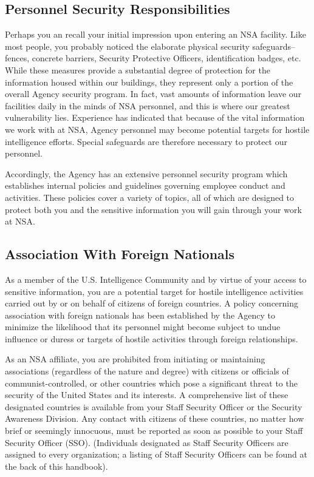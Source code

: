 \documentclass[a4]{article}
\begin{document}
\subsection{Personnel Security Responsibilities}

Perhaps you an recall your initial impression upon entering an NSA facility.
Like most people, you probably noticed the elaborate physical security
safeguards--fences, concrete barriers, Security Protective Officers,
identification badges, etc.  While these measures provide a substantial degree
of protection for the information housed within our buildings, they represent
only a portion of the overall Agency security program.  In fact, vast amounts
of information leave our facilities daily in the minds of NSA personnel, and
this is where our greatest vulnerability lies.  Experience has indicated that
because of the vital information we work with at NSA, Agency personnel may
become potential targets for hostile intelligence efforts.  Special safeguards
are therefore necessary to protect our personnel.

Accordingly, the Agency has an extensive personnel security program which
establishes internal policies and guidelines governing employee conduct and
activities.  These policies cover a variety of topics, all of which are
designed to protect both you and the sensitive information you will gain
through your work at NSA.

\subsection{Association With Foreign Nationals}

As a member of the U.S. Intelligence Community and by virtue of your access to
sensitive information, you are a potential target for hostile intelligence
activities carried out by or on behalf of citizens of foreign
countries.  A policy concerning association with foreign nationals has been
established by the Agency to minimize the likelihood that its personnel might
become subject to undue influence or duress or targets of hostile activities
through foreign relationships.

As an NSA affiliate, you are prohibited from initiating or maintaining
associations (regardless of the nature and degree) with citizens or officials
of communist-controlled, or other countries which pose a significant threat to
the security of the United States and its interests.  A comprehensive list of
these designated countries is available from your Staff Security Officer or the
Security Awareness Division.  Any contact with citizens of these countries, no
matter how brief or seemingly innocuous, must be reported as soon as possible
to your Staff Security Officer (SSO).  (Individuals designated as Staff
Security Officers are assigned to every organization; a listing of Staff
Security Officers can be found at the back of this handbook).
\end{document}
